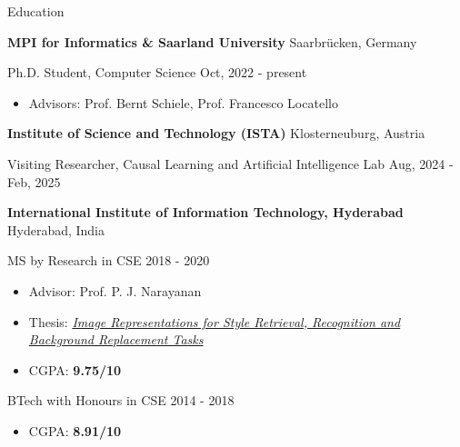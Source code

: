 \documentclass{resume} %
\begin{document}

\begin{rSection}{Education}

{\bf MPI for Informatics \& Saarland University} \hfill {Saarbrücken, Germany}

Ph.D. Student, Computer Science \hfill {Oct, 2022 - present}
\begin{itemize} \itemsep -1.0mm
    \item Advisors: Prof. Bernt Schiele, Prof. Francesco Locatello
\end{itemize}

{\bf Institute of Science and Technology (ISTA)} \hfill {Klosterneuburg, Austria}

Visiting Researcher, Causal Learning and Artificial Intelligence Lab \hfill {Aug, 2024 - Feb, 2025}

{\bf International Institute of Information Technology, Hyderabad} \hfill {Hyderabad, India} 

MS by Research in CSE \hfill {2018 - 2020}
\begin{small}
\begin{itemize}\itemsep -1.0mm 
    \item Advisor: Prof. P. J. Narayanan
    \item Thesis: \textit{\href{https://web2py.iiit.ac.in/research_centres/publications/view_publication/mastersthesis/828}{Image Representations for Style Retrieval, Recognition and Background Replacement Tasks}}
    \item CGPA: \textbf{9.75/10}
\end{itemize}
\end{small}

BTech with Honours in CSE \hfill {2014 - 2018}
\begin{small}
\begin{itemize}\itemsep -1.0mm 
    \item CGPA: \textbf{8.91/10}
\end{itemize}
\end{small}



\end{rSection}
\end{document}
